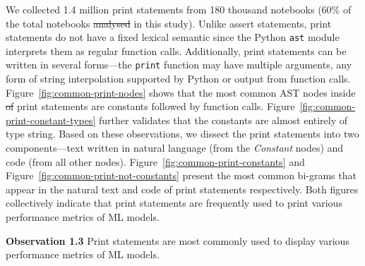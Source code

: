 \documentclass[smallextended]{svjour3}       %
\newcommand{\highlight}[1]{\begin{framed}%
  \noindent#1
\end{framed}}
\providecommand{\DIFadd}[1]{{\protect\color{blue}\uwave{#1}}} %
\providecommand{\DIFdel}[1]{{\protect\color{red}\sout{#1}}} %
\providecommand{\DIFaddbegin}{} %
\providecommand{\DIFaddend}{} %
\providecommand{\DIFdelbegin}{} %
\providecommand{\DIFdelend}{} %
\newcommand{\DIFscaledelfig}{0.5}
\newlength{\DIFdelgraphicswidth} %
\newlength{\DIFdelgraphicsheight} %
\newcommand{\DIFaddincludegraphics}[2][]{{\color{blue}\fbox{\DIFOincludegraphics[#1]{#2}}}} %
\newcommand{\DIFdelincludegraphics}[2][]{%
\sbox{\DIFdelgraphicsbox}{\DIFOincludegraphics[#1]{#2}}%
\settoboxwidth{\DIFdelgraphicswidth}{\DIFdelgraphicsbox} %
\settoboxtotalheight{\DIFdelgraphicsheight}{\DIFdelgraphicsbox} %
\scalebox{\DIFscaledelfig}{%
\parbox[b]{\DIFdelgraphicswidth}{\usebox{\DIFdelgraphicsbox}\\[-\baselineskip] \rule{\DIFdelgraphicswidth}{0em}}\llap{\resizebox{\DIFdelgraphicswidth}{\DIFdelgraphicsheight}{%
\setlength{\unitlength}{\DIFdelgraphicswidth}%
\begin{picture}(1,1)%
\thicklines\linethickness{2pt} %
{\color[rgb]{1,0,0}\put(0,0){\framebox(1,1){}}}%
{\color[rgb]{1,0,0}\put(0,0){\line( 1,1){1}}}%
{\color[rgb]{1,0,0}\put(0,1){\line(1,-1){1}}}%
\end{picture}%
}\hspace*{3pt}}} %
} %
\DeclareRobustCommand{\DIFaddbegin}{\DIFOaddbegin \let\includegraphics\DIFaddincludegraphics} %
\DeclareRobustCommand{\DIFaddend}{\DIFOaddend \let\includegraphics\DIFOincludegraphics} %
\DeclareRobustCommand{\DIFdelbegin}{\DIFOdelbegin \let\includegraphics\DIFdelincludegraphics} %
\DeclareRobustCommand{\DIFdelend}{\DIFOaddend \let\includegraphics\DIFOincludegraphics} %
\begin{document}
We collected 1.4 million print statements from 180 thousand notebooks (60\% of the total notebooks \DIFdelbegin \DIFdel{analysed }\DIFdelend \DIFaddbegin \DIFadd{analyzed }\DIFaddend in this study). Unlike assert statements, print statements do not have a fixed lexical semantic since the Python \lstinline{ast} module interprets them as regular function calls. Additionally, print statements can be written in several forms---the \lstinline{print} function may have multiple arguments, any form of string interpolation supported by Python or output from function calls. Figure~\ref{fig:common-print-nodes} shows that the most common AST nodes inside \DIFdelbegin \DIFdel{of }\DIFdelend print statements are constants followed by function calls. Figure~\ref{fig:common-print-constant-types} further validates that the constants are almost entirely of type string. Based on these observations, we dissect the print statements into two components---text written in natural language (from the \emph{Constant} nodes) and code (from all other nodes). Figure~\ref{fig:common-print-constants} and Figure~\ref{fig:common-print-not-constants} present the most common bi-grams that appear in the natural text and code of print statements respectively. Both figures collectively indicate that print statements are frequently used to print various performance metrics of ML models.

\DIFdelbegin %
\DIFdelend \DIFaddbegin \highlight{\textbf{Observation 1.3} Print statements are most commonly used to display various performance metrics of ML models.}
\DIFaddend 
\end{document}
